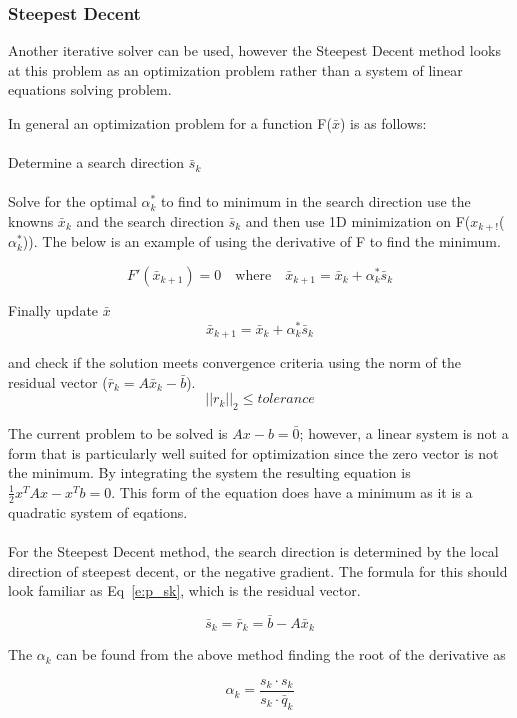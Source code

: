 \documentclass[]{aiaa-tc}%
\begin{document}
\subsubsection{Steepest Decent}
Another iterative solver can be used, however the Steepest Decent method looks
at this problem as an optimization problem rather than a system of linear equations
solving problem.

In general an optimization problem for a function F($\bar x$) is as follows:
\\\\
Determine a search direction $\bar s_k$
\\\\
Solve for the optimal $\alpha_k^{*}$ to find to minimum in the search direction
use the knowns $\bar x_k$ and the search direction $\bar s_k$ and then use 1D minimization
on F($x_{k+!}$($\alpha_k^{*}$)). The below is an example of using the derivative
of F to find the minimum.

$$
   F'(\bar x_{k+1}) = 0 \quad \textrm{where} \quad \bar x_{k+1} = \bar x_{k} + \alpha_k^{*} \bar s_k
$$


Finally update $\bar x$
$$
   \bar x_{k+1} = \bar x_{k} + \alpha_k^{*} \bar s_k
$$

and check if the solution meets convergence criteria using the norm of the
residual vector ($\bar r_k = A \bar x_k - \bar b$).
$$
\vert\vert r_k \vert\vert_2 \leq tolerance
$$

The current problem to be solved is $Ax-b=\bar 0$; however, a linear system is not a form that
is particularly well suited for optimization since the zero vector is not the
minimum. By integrating the system the resulting equation is $\frac{1}{2} x^T A x - x^T b = 0$.
This form of the equation does have a minimum as it is a quadratic system of eqations.
\\\\
For the Steepest Decent method, the search direction is determined by the local
direction of steepest decent, or the negative gradient. The formula for this should look
familiar as Eq~\ref{e:p_sk}, which is the residual vector.

\begin{equation}
  \label{e:p_sk}
  \bar s_k = \bar r_k = \bar b - A \bar x_k
\end{equation}

The $\alpha_k$ can be found from the above method finding the root of the derivative
as

$$
  \alpha_k = \frac{s_k \cdotp s_k}{s_k \cdotp \bar q_k}
$$
\end{document}
